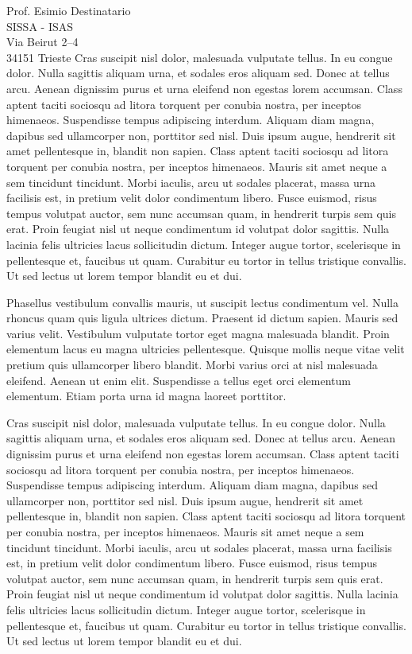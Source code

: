 \documentclass[10pt,italian,a4paper]{letteracdp}
\begin{document}
\begin{foldedletter}{
    Prof. Esimio Destinatario\\
    SISSA - ISAS\\
    Via Beirut 2--4\\
    34151 Trieste
  }
Cras suscipit nisl dolor, malesuada vulputate tellus. In eu congue dolor. Nulla sagittis aliquam urna, et sodales eros aliquam sed. Donec at tellus arcu. Aenean dignissim purus et urna eleifend non egestas lorem accumsan. Class aptent taciti sociosqu ad litora torquent per conubia nostra, per inceptos himenaeos. Suspendisse tempus adipiscing interdum. Aliquam diam magna, dapibus sed ullamcorper non, porttitor sed nisl. Duis ipsum augue, hendrerit sit amet pellentesque in, blandit non sapien. Class aptent taciti sociosqu ad litora torquent per conubia nostra, per inceptos himenaeos. Mauris sit amet neque a sem tincidunt tincidunt. Morbi iaculis, arcu ut sodales placerat, massa urna facilisis est, in pretium velit dolor condimentum libero. Fusce euismod, risus tempus volutpat auctor, sem nunc accumsan quam, in hendrerit turpis sem quis erat. Proin feugiat nisl ut neque condimentum id volutpat dolor sagittis. Nulla lacinia felis ultricies lacus sollicitudin dictum. Integer augue tortor, scelerisque in pellentesque et, faucibus ut quam. Curabitur eu tortor in tellus tristique convallis. Ut sed lectus ut lorem tempor blandit eu et dui.

Phasellus vestibulum convallis mauris, ut suscipit lectus condimentum vel. Nulla rhoncus quam quis ligula ultrices dictum. Praesent id dictum sapien. Mauris sed varius velit. Vestibulum vulputate tortor eget magna malesuada blandit. Proin elementum lacus eu magna ultricies pellentesque. Quisque mollis neque vitae velit pretium quis ullamcorper libero blandit. Morbi varius orci at nisl malesuada eleifend. Aenean ut enim elit. Suspendisse a tellus eget orci elementum elementum. Etiam porta urna id magna laoreet porttitor.

Cras suscipit nisl dolor, malesuada vulputate tellus. In eu congue dolor. Nulla sagittis aliquam urna, et sodales eros aliquam sed. Donec at tellus arcu. Aenean dignissim purus et urna eleifend non egestas lorem accumsan. Class aptent taciti sociosqu ad litora torquent per conubia nostra, per inceptos himenaeos. Suspendisse tempus adipiscing interdum. Aliquam diam magna, dapibus sed ullamcorper non, porttitor sed nisl. Duis ipsum augue, hendrerit sit amet pellentesque in, blandit non sapien. Class aptent taciti sociosqu ad litora torquent per conubia nostra, per inceptos himenaeos. Mauris sit amet neque a sem tincidunt tincidunt. Morbi iaculis, arcu ut sodales placerat, massa urna facilisis est, in pretium velit dolor condimentum libero. Fusce euismod, risus tempus volutpat auctor, sem nunc accumsan quam, in hendrerit turpis sem quis erat. Proin feugiat nisl ut neque condimentum id volutpat dolor sagittis. Nulla lacinia felis ultricies lacus sollicitudin dictum. Integer augue tortor, scelerisque in pellentesque et, faucibus ut quam. Curabitur eu tortor in tellus tristique convallis. Ut sed lectus ut lorem tempor blandit eu et dui.


\end{foldedletter}
\end{document}
